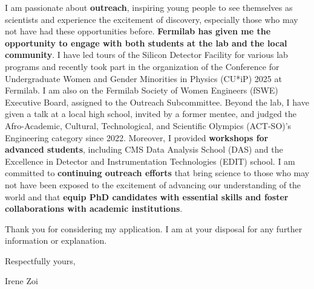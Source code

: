 {\begin{flushleft}

\vskip 10pt
I am passionate about {\bf outreach}, inspiring young people to see themselves as scientists and experience the excitement of discovery, especially those who may not have had these opportunities before. {\bf Fermilab has given me the opportunity to engage with both students at the lab and the local community}. I have led tours of the Silicon Detector Facility for various lab programs and recently took part in the organization of the Conference for Undergraduate Women and Gender Minorities in Physics (CU*iP) 2025 at Fermilab. I am also on the Fermilab Society of Women Engineers (fSWE) Executive Board, assigned to the Outreach Subcommittee. Beyond the lab, I have given a talk at a local high school, invited by a former mentee, and judged the Afro-Academic, Cultural, Technological, and Scientific Olympics (ACT-SO)’s Engineering category since 2022. Moreover, I  provided {\bf workshops for advanced students}, including CMS Data Analysis School (DAS) and the Excellence in Detector and Instrumentation Technologies (EDIT) school. I am committed to {\bf continuing outreach efforts} that bring science to those who may not have been exposed to the excitement of advancing our understanding of the world and that {\bf equip PhD candidates with essential skills and foster collaborations with academic institutions}.

Thank you for considering my application. I am at your disposal for any further information or explanation.

Respectfully yours,

Irene Zoi
\end{flushleft}

}